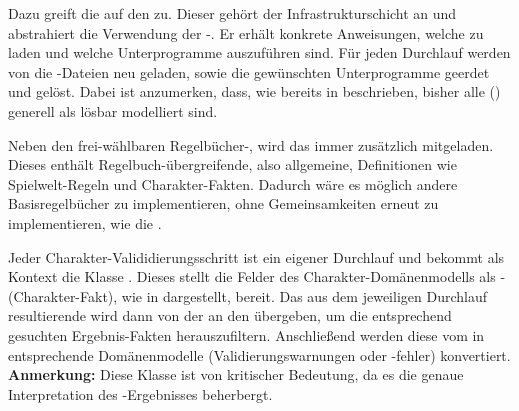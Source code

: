 Dazu greift die  auf den  zu.
Dieser gehört der Infrastrukturschicht an und abstrahiert die Verwendung der -.
Er erhält konkrete Anweisungen, welche  zu laden und welche Unterprogramme auszuführen sind.
Für jeden Durchlauf werden von  die -Dateien neu geladen, sowie die gewünschten Unterprogramme geerdet und gelöst.
Dabei ist anzumerken, dass, wie bereits in  beschrieben, bisher alle  () generell als lösbar modelliert sind.

Neben den frei-wählbaren Regelbücher-, wird das  immer zusätzlich mitgeladen.
Dieses enthält Regelbuch-übergreifende, also allgemeine, Definitionen wie Spielwelt-Regeln und Charakter-Fakten.
Dadurch wäre es möglich andere Basisregelbücher zu implementieren, ohne Gemeinsamkeiten erneut zu implementieren, wie \zB die .

Jeder Charakter-Valididierungsschritt ist ein eigener Durchlauf und bekommt als Kontext die Klasse .
Dieses stellt die Felder des Charakter-Domänenmodells als - (Charakter-Fakt), wie in  dargestellt, bereit.
Das aus dem jeweiligen Durchlauf resultierende  wird dann von der  an den  übergeben, um die entsprechend gesuchten Ergebnis-Fakten herauszufiltern.
Anschließend werden diese vom  in entsprechende Domänenmodelle (Validierungswarnungen oder -fehler) konvertiert.
\textbf{Anmerkung:} Diese Klasse ist von kritischer Bedeutung, da es die genaue Interpretation des -Ergebnisses beherbergt.
